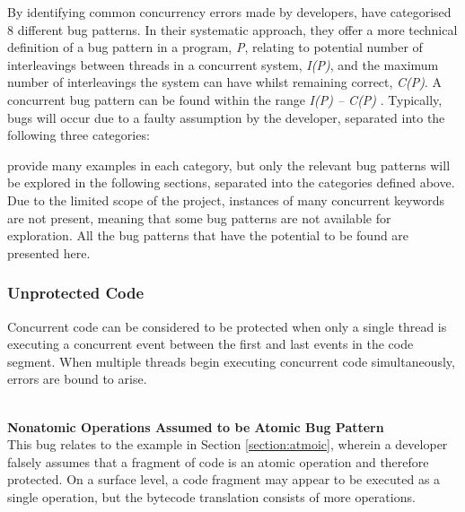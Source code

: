 \documentclass[a4paper,12pt]{article}
\begin{document}
By identifying common concurrency errors made by developers, \citet{farchi03} have categorised 8 different bug patterns. In their systematic approach, they offer a more technical definition of a bug pattern in a program,\textit{ P}, relating to potential number of interleavings between threads in a concurrent system,\textit{ I(P)}, and the maximum number of interleavings the system can have whilst remaining correct, \textit{C(P)}. A concurrent bug pattern can be found within the range \textit{I(P) – C(P)} \citet{farchi03}. Typically, bugs will occur due to a faulty assumption by the developer, separated into the following three categories: 


\citet{farchi03} provide many examples in each category, but only the relevant bug patterns will be explored in the following sections, separated into the categories defined above. Due to the limited scope of the project, instances of many concurrent keywords are not present, meaning that some bug patterns are not available for exploration. All the bug patterns that have the potential to be found are presented here.

\subsubsection{Unprotected Code} \label{section:Unprotected Code}
Concurrent code can be considered to be protected when only a single thread is executing a concurrent event between the first and last events in the code segment. When multiple threads begin executing concurrent code simultaneously, errors are bound to arise.   

\textbf{\\Nonatomic Operations Assumed to be Atomic Bug Pattern} 
\\This bug relates to the example in Section \ref{section:atmoic}, wherein a developer falsely assumes that a fragment of code is an atomic operation and therefore protected. On a surface level, a code fragment may appear to be executed as a single operation, but the bytecode translation consists of more operations.
\end{document}

